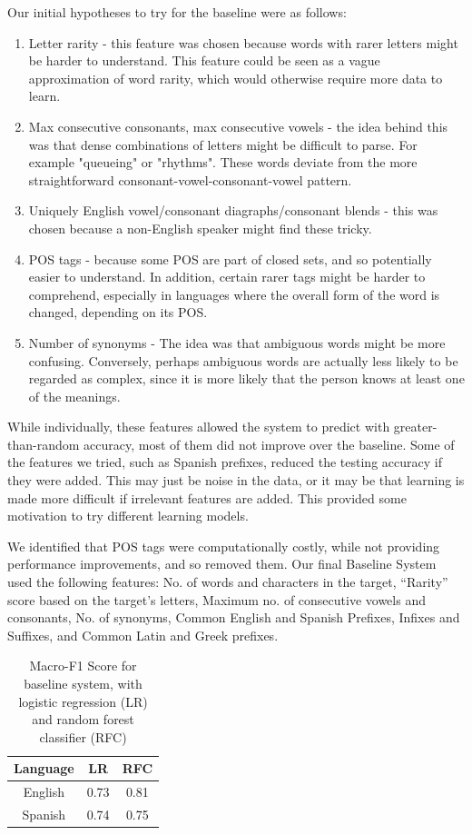\documentclass[11pt,a4paper]{article}
\begin{document}
Our initial hypotheses to try for the baseline were as follows:
\begin{enumerate}
\item Letter rarity - this feature was chosen because words with rarer letters might be harder to understand. This feature could be seen as a vague approximation of word rarity, which would otherwise require more data to learn.
\item Max consecutive consonants, max consecutive vowels - the idea behind this was that dense combinations of letters might be difficult to parse. For example "queueing" or "rhythms". These words deviate from the more straightforward consonant-vowel-consonant-vowel pattern.
\item Uniquely English vowel/consonant diagraphs/consonant blends - this was chosen because a non-English speaker might find these tricky.
\item POS tags - because some POS are part of closed sets, and so potentially easier to understand. In addition, certain rarer tags might be harder to comprehend, especially in languages where the overall form of the word is changed, depending on its POS.
\item Number of synonyms - The idea was that ambiguous words might be more confusing. Conversely, perhaps ambiguous words are actually less likely to be regarded as complex, since it is more likely that the person knows at least one of the meanings.
\end{enumerate}

While individually, these features allowed the system to predict with greater-than-random accuracy, most of them did not improve over the baseline. Some of the features we tried, such as Spanish prefixes, reduced the testing accuracy if they were added. This may just be noise in the data, or it may be that learning is made more difficult if irrelevant features are added. This provided some motivation to try different learning models.

We identified that POS tags were computationally costly, while not providing performance improvements, and so removed them. Our final Baseline System used the following features: No. of words and characters in the target, \enquote{Rarity} score based on the target's letters, Maximum no. of consecutive vowels and consonants, No. of synonyms, Common English and Spanish Prefixes, Infixes and Suffixes, and Common Latin and Greek prefixes.

\begin{table}[h]
\begin{center}
\begin{tabular}{|c|c|c|}
\hline
\textbf{Language} & \textbf{LR} & \textbf{RFC} \\
\hline
English & 0.73 & 0.81 \\ \hline
Spanish & 0.74 & 0.75 \\ \hline
\end{tabular}
\caption{Macro-F1 Score for baseline system, with logistic regression (LR) and random forest classifier (RFC)}
\label{tab:baseline}
\end{center}
\end{table}
\end{document}
